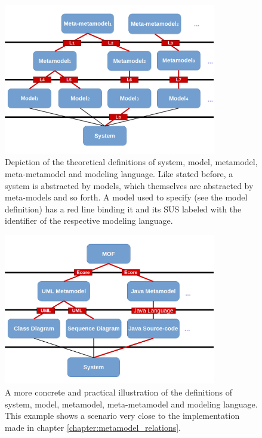 \documentclass[tuberlin,cic,tc,english,noabntcite]{iiufrgs}
\begin{document}
\begin{description}
	\begin{figure}[h]
	    \caption{Depiction of the theoretical definitions of system, model, metamodel, meta-metamodel and modeling language. Like stated before, a system is abstracted by models, which themselves are abstracted by meta-models and so forth. A model used to specify (see the model definition) has a red line binding it and its SUS labeled with the identifier of the respective modeling language.}
	    \begin{center}
	        \includegraphics[width=25em]{model_scheme}
	    \end{center}
	    \label{fig:model_scheme}
	\end{figure}
	\begin{figure}[h]
	    \caption{A more concrete and practical illustration of the definitions of system, model, metamodel, meta-metamodel and modeling language. This example shows a scenario very close to the implementation made in chapter \ref{chapter:metamodel_relations}.}
	    \begin{center}
	        \includegraphics[width=25em]{model_scheme_practice}
	    \end{center}
	    \label{fig:model_scheme_practice}
	\end{figure}
	

\end{description}
\end{document}
